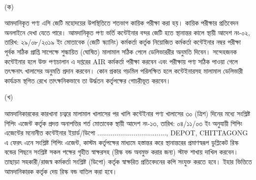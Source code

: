 \documentclass[12pt]{article}
\newcommand{\rdepo}{...................................., DEPOT, CHITTAGONG}
\begin{document}
\\
\begin{minipage}[t]{0.04\linewidth}
\hspace{0.5em}
\end{minipage}
\begin{minipage}[t]{0.04\linewidth}
\scriptsize{(ক)}
\end{minipage}
\begin{minipage}[t]{.92\linewidth}
\scriptsize{
আমদানিকৃত পণ্য
এসি জেটি মহোদয়ের উপস্থিতিতে
শতভাগ কায়িক পরীক্ষা করা হয়।
কায়িক পরীক্ষার প্রতিবেদন অনলাইনে দেখা যেতে পারে।
আমদানিকৃত পণ্য ভর্তি
কন্টেইনার বন্দর জেটি
হতে স্থানান্তর কালে স্থায়ী
আদেশ নং-০২, তারিখ: ২৯/০৮/২০১৯ ইং
মোতাবেক (জেটি স্ক্যানিং)
কর্মকর্তা কর্তৃক
নিয়োজিত কর্মকর্তা
কন্টেইনার
নম্বর পরীক্ষা পূর্বক
সঠিক প্রাপ্তি সাপেক্ষে
শুল্কায়িত (ঘোষিত) মালামাল সঠিক পেলে
ডেলিভাররীর অনুমতি
দিবেন। সন্দেহজনক কন্টেইনার হলে
উক্ত পণ্যচালান এ দপ্তরের AIR কর্মকর্তা
পরীক্ষা করবেন এবং পরীক্ষায় পণ্য সঠিক পাওয়া গেলে
তৎক্ষনাৎ খালাসের অনুমতি প্রদান করবেন।
কোন প্রকার গড়মিল পরিলক্ষিত হলে
কন্টেইনারসহ মালামাল ডেলিভারী কার্যক্রম স্থগিত রেখে
তাৎক্ষনিকভাবে তা উর্দ্ধতন কর্তৃপক্ষের গোচরীভূত করবেন।}
\\
\end{minipage}
\begin{minipage}[t]{0.04\linewidth}
\hspace{0.5em}
\end{minipage}
\begin{minipage}[t]{0.04\linewidth}
\scriptsize{(খ)}
\end{minipage}
\begin{minipage}[t]{0.92\linewidth}
\scriptsize{আমদানিকারকের কারখানা চত্বরে
মালামাল খালাসের পর খালি কন্টেইনার পণ্য খালাসের
৩০ (ত্রিশ) দিনের মধ্যে সংশ্লিষ্ট শিপিং এজেন্ট কর্তৃক
প্রদত্ত অনাপত্তির শর্ত মোতাবেক স্থায়ী
আদেশ নং-১৩, তারিখ: ০৪/১১/০৩ ইং
অনুযায়ী শিপিং এজেন্টের মনোনীত কন্টেইনার
ইয়ার্ড/ডিপো {\rdepo} এ ফেরৎ এনে সংশ্লিষ্ট
শিপিং এজেন্ট, কাস্টম কর্তৃপক্ষের মাধ্যমে হস্তান্তর করে
স্থানান্তরের প্রমাণস্বরূপ ডুপ্লিকেট রিস্ক বন্ডের পিছনে
সংশ্লিষ্ট সকল পক্ষের গৃহীত স্বাক্ষরসহ
(রিস্ক বন্ড অবমুক্ত করার জন্য)
স্টাফ শাখায় দাখিল করবেন।
তাছাড়া সহকারী/রাজস্ব কর্মকর্তা সংশ্লিষ্ট (ডিপো) কর্তৃক
স্বাক্ষরিত প্রতিবেদনের কপি সংযুক্ত করতে হবে।
ইহার ভিত্তিতে আমদানিকারক কর্তৃক দেয়
রিস্ক বন্ড বাতিল করা হবে।}
\\
\\
\\
\\
\\
\\
\end{minipage}
\end{document}
